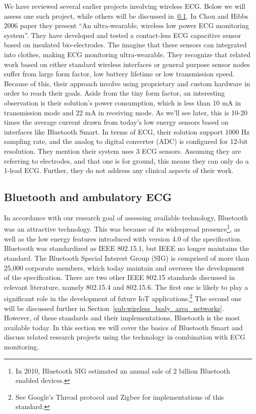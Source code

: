 We have reviewed several earlier projects involving wireless ECG. Below we will assess one such project, while others will be discussed in~\ref{sub:bluetooth}. In Chou and Hibbs 2006 paper \cite{ChulsungPark:2006tf} they present ``An ultra-wearable, wireless low power ECG monitoring system''. They have developed and tested a contact-less ECG capacitive sensor based on insulated bio-electrodes. The imagine that these sensors can integrated into clothes, making ECG monitoring ultra-wearable. They recognize that related work based on either standard wireless interfaces or general purpose sensor nodes suffer from large form factor, low battery lifetime or low transmission speed. Because of this, their approach involve using proprietary and custom hardware in order to reach their goals. Aside from the tiny form factor, an interesting observation is their solution's power consumption, which is less than 10 mA in transmission mode and 22 mA in receiving mode. As we'll see later, this is 10-20 times the average current drawn from today's low energy sensors based on interfaces like Bluetooth Smart. In terms of ECG, their solution support 1000 Hz sampling rate, and the analog to digital converter (ADC) is configured for 12-bit resolution. They mention their system uses 3 ECG sensors. Assuming they are referring to electrodes, and that one is for ground, this means they can only do a 1-lead ECG. Further, they do not address any clinical aspects of their work.


\subsection{Bluetooth and ambulatory ECG} %
\label{sub:bluetooth}

In accordance with our research goal of assessing available technology, Bluetooth was an attractive technology. This was because of its widespread presence\footnote{ In 2010, Bluetooth SIG estimated an annual sale of 2 billion Bluetooth enabled devices.}, as well as the low energy features introduced with version 4.0 of the specification. Bluetooth was standardized as IEEE 802.15.1, but IEEE no longer maintains the standard. The Bluetooth Special Interest Group (SIG) is comprised of more than 25,000 corporate members, which today maintain and oversees the development of the specification. There are two other IEEE 802.15 standards discussed in relevant literature, namely 802.15.4 and 802.15.6. The first one is likely to play a significant role in the development of future IoT applications.\footnote{ See Google's Thread protocol and Zigbee for implementations of this standard.} The second one will be discussed further in Section~\ref{sub:wireless_body_area_networks}. However, of these standards and their implementations, Bluetooth is the most available today. In this section we will cover the basics of Bluetooth Smart and discuss related research projects using the technology in combination with ECG monitoring.

